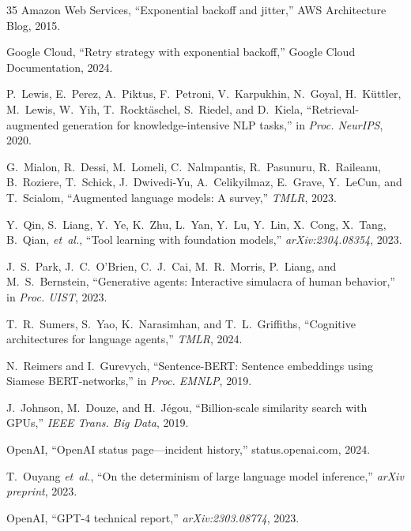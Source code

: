 \documentclass[conference]{IEEEtran}
\begin{document}
\begin{thebibliography}{35}
Amazon Web Services, ``Exponential backoff and jitter,'' AWS Architecture Blog, 2015.

Google Cloud, ``Retry strategy with exponential backoff,'' Google Cloud Documentation, 2024.

P.~Lewis, E.~Perez, A.~Piktus, F.~Petroni, V.~Karpukhin, N.~Goyal, H.~K{\"u}ttler, M.~Lewis, W.~Yih, T.~Rockt{\"a}schel, S.~Riedel, and D.~Kiela, ``Retrieval-augmented generation for knowledge-intensive NLP tasks,'' in \textit{Proc. NeurIPS}, 2020.

G.~Mialon, R.~Dessi, M.~Lomeli, C.~Nalmpantis, R.~Pasunuru, R.~Raileanu, B.~Roziere, T.~Schick, J.~Dwivedi-Yu, A.~Celikyilmaz, E.~Grave, Y.~LeCun, and T.~Scialom, ``Augmented language models: A survey,'' \textit{TMLR}, 2023.

Y.~Qin, S.~Liang, Y.~Ye, K.~Zhu, L.~Yan, Y.~Lu, Y.~Lin, X.~Cong, X.~Tang, B.~Qian, \textit{et~al.}, ``Tool learning with foundation models,'' \textit{arXiv:2304.08354}, 2023.

J.~S.~Park, J.~C.~O'Brien, C.~J.~Cai, M.~R.~Morris, P.~Liang, and M.~S.~Bernstein, ``Generative agents: Interactive simulacra of human behavior,'' in \textit{Proc. UIST}, 2023.

T.~R.~Sumers, S.~Yao, K.~Narasimhan, and T.~L.~Griffiths, ``Cognitive architectures for language agents,'' \textit{TMLR}, 2024.

N.~Reimers and I.~Gurevych, ``Sentence-BERT: Sentence embeddings using Siamese BERT-networks,'' in \textit{Proc. EMNLP}, 2019.

J.~Johnson, M.~Douze, and H.~J{\'e}gou, ``Billion-scale similarity search with GPUs,'' \textit{IEEE Trans. Big Data}, 2019.

OpenAI, ``OpenAI status page---incident history,'' status.openai.com, 2024.

T.~Ouyang \textit{et~al.}, ``On the determinism of large language model inference,'' \textit{arXiv preprint}, 2023.

OpenAI, ``GPT-4 technical report,'' \textit{arXiv:2303.08774}, 2023.

\end{thebibliography}
\end{document}
